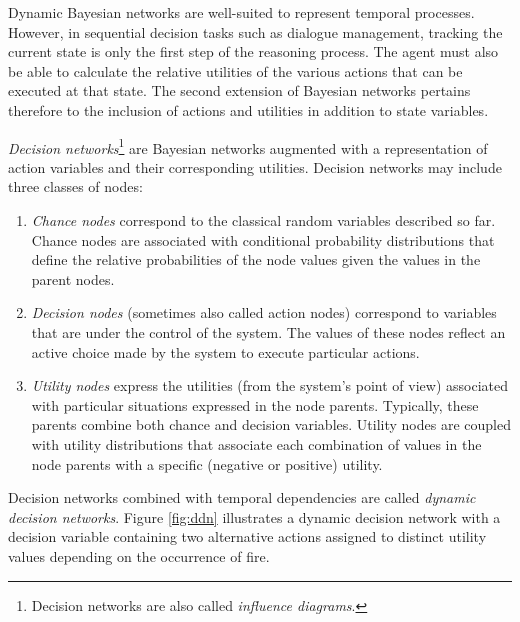 Dynamic Bayesian networks are well-suited to represent temporal processes.  However, in sequential decision tasks such as dialogue management, tracking the current state is only the first step of the reasoning process. The agent must also be able to calculate the relative utilities of the various actions that can be executed at that  state. The second extension of Bayesian networks pertains therefore to the inclusion of actions and utilities in addition to state variables.  

\textit{Decision networks}\footnote{Decision networks are also called \textit{influence diagrams}.} are Bayesian networks augmented with a representation of action variables and their corresponding utilities. Decision networks may include three classes of nodes:
\begin{enumerate}
\item \textit{Chance nodes} correspond to the classical random variables described so far.  Chance nodes are associated with conditional probability distributions that define the relative probabilities of the node values given the values in the parent nodes.
\item \textit{Decision nodes} (sometimes also called action nodes) correspond to variables that are under the control of the system.  The values of these nodes reflect an active choice made by the system to execute particular actions.
\item \textit{Utility nodes} express the utilities (from the system's point of view) associated with particular situations expressed in the node parents.  Typically, these parents combine both chance and decision variables.   Utility nodes are coupled with utility distributions that associate each combination of values in the node parents with a specific (negative or positive) utility. 
\end{enumerate}

Decision networks combined with temporal dependencies are called \textit{dynamic decision networks}.  Figure \ref{fig:ddn} illustrates a dynamic decision network with a decision variable containing two alternative actions assigned to distinct utility values depending on the occurrence of fire. 

 
